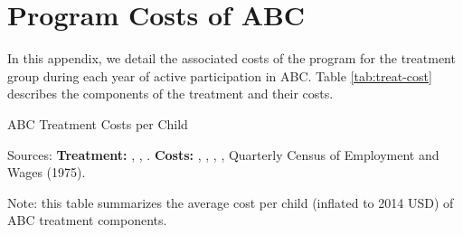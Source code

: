 \section{Program Costs of ABC} \label{app:programcosts}
\noindent In this appendix, we detail the associated costs of the program for the treatment group during each year of active participation in ABC. Table \ref{tab:treat-cost}  describes the components of the treatment and their costs. \\


\begin{table}[H]
\caption{ABC Treatment Costs per Child} \label{tab:treat-cost}
\centering
\begin{adjustbox}{max width=\textwidth}
\begin{threeparttable}
\scriptsize

\begin{tablenotes}
\scriptsize
\item Sources: \textbf{Treatment:} \cite{Ramey_Collier_etal_1976_CarolinaAbecedarianProject}, \cite{Ramey_McGinness_etal_1982_Abecedarianapproach}, \cite{Clarke_Campbell_1998_ABC_Comparison_ECRQ}. \textbf{Costs:} \cite{Barnett_Masse_2002_benefitcost},  \cite{FPGC_Progress-Report_1973}, \cite{Cutler_Meara_1998_Med-Costs_BOOK}, \cite{Helburn_1995_Childcare-Report}, Quarterly Census of Employment and Wages (1975).

\item Note: this table summarizes the average cost per child (inflated to 2014 USD) of ABC treatment components.
\end{tablenotes}
\end{threeparttable}
\end{adjustbox}
\end{table}

